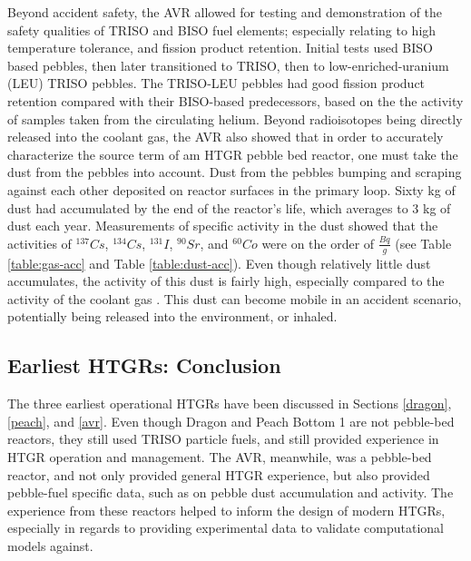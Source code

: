 Beyond accident safety, the AVR allowed for testing and demonstration of the safety qualities of TRISO and BISO fuel elements; especially relating to high temperature tolerance, and fission product retention.  Initial tests used BISO based pebbles, then later transitioned to TRISO, then to low-enriched-uranium (LEU) TRISO pebbles.  The TRISO-LEU pebbles had good fission product retention compared with their BISO-based predecessors, based on the the activity of samples taken from the circulating helium.  Beyond radioisotopes being directly released into the coolant gas, the AVR also showed that in order to accurately characterize the source term of am HTGR pebble bed reactor, one must take the dust from the pebbles into account.  Dust from the pebbles bumping and scraping against each other deposited on reactor surfaces in the primary loop.  Sixty kg of dust had accumulated by the end of the reactor's life, which averages to 3 kg of dust each year.  Measurements of specific activity in the dust showed that the activities of $^{137}Cs$, $^{134}Cs$, $^{131}I$, $^{90}Sr$, and $^{60}Co$ were on the order of $\frac{Bq}{g}$ (see Table \ref{table:gas-acc} and Table \ref{table:dust-acc}).  Even though relatively little dust accumulates, the activity of this dust is fairly high, especially compared to the activity of the coolant gas \cite{noauthor_results_1990}.  This dust can become mobile in an accident scenario, potentially being released into the environment, or inhaled.




\subsection{Earliest HTGRs: Conclusion}

The three earliest operational HTGRs have been discussed in Sections \autoref{dragon}, \autoref{peach}, and \autoref{avr}.  Even though Dragon and Peach Bottom 1 are not pebble-bed reactors, they still used TRISO particle fuels, and still provided experience in HTGR operation and management.  The AVR, meanwhile, was a pebble-bed reactor, and not only provided general HTGR experience, but also provided pebble-fuel specific data, such as on pebble dust accumulation and activity.  The experience from these reactors helped to inform the design of modern HTGRs, especially in regards to providing experimental data to validate computational models against.